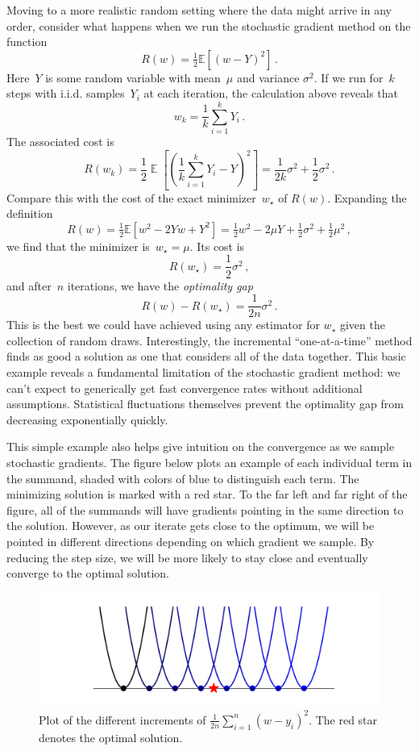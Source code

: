 \documentclass{tufte-book}
\begin{document}
Moving to a more realistic random setting where the data might arrive in
any order, consider what happens when we run the stochastic gradient
method on the function \[
    R(w) = \tfrac{1}{2} \mathbb{E}[ (w-Y)^2]\,.
\] Here~\(Y\) is some random variable with mean~\(\mu\) and variance
\(\sigma^2\). If we run for~\(k\) steps with i.i.d. samples~\(Y_i\) at
each iteration, the calculation above reveals that \[
    w_k = \frac{1}{k} \sum_{i=1}^k Y_i\,.
\] The associated cost is \[
    R(w_k) = \frac{1}{2} \mathop\mathbb{E}\left[ \left(\frac{1}{k} \sum_{i=1}^k Y_i-Y\right)^2\right]
    = \frac{1}{2k}\sigma^2 + \frac{1}{2}\sigma^2\,.
\] Compare this with the cost of the exact minimizer~\(w_\star\) of
\(R(w)\). Expanding the definition \[
    R(w) = \tfrac{1}{2} \mathbb{E}[w^2 - 2 Y w + Y^2] = \tfrac{1}{2}w^2 - 2 \mu Y + \tfrac{1}{2}\sigma^2 + \tfrac{1}{2}\mu^2\,,
\] we find that the minimizer is~\(w_\star=\mu\). Its cost is \[
    R(w_\star) = \frac{1}{2} \sigma^2\,,
\] and after~\(n\) iterations, we have the \emph{optimality gap} \[
    R(w)-R(w_\star) = \frac{1}{2n}\sigma^2\,.
\] This is the best we could have achieved using any estimator for
\(w_\star\) given the collection of random draws. Interestingly, the
incremental ``one-at-a-time'' method finds as good a solution as one
that considers all of the data together. This basic example reveals a
fundamental limitation of the stochastic gradient method: we can't
expect to generically get fast convergence rates without additional
assumptions. Statistical fluctuations themselves prevent the optimality
gap from decreasing exponentially quickly.

This simple example also helps give intuition on the convergence as we
sample stochastic gradients. The figure below plots an example of each
individual term in the summand, shaded with colors of blue to
distinguish each term. The minimizing solution is marked with a red
star. To the far left and far right of the figure, all of the summands
will have gradients pointing in the same direction to the solution.
However, as our iterate gets close to the optimum, we will be pointed in
different directions depending on which gradient we sample. By reducing
the step size, we will be more likely to stay close and eventually
converge to the optimal solution.

\begin{figure}
\centering
\includegraphics{assets/confusion_region}
\caption{Plot of the different increments of
\(\tfrac{1}{2n} \sum_{i=1}^n (w-y_i)^2\). The red star denotes the
optimal solution.}
\end{figure}
\end{document}

